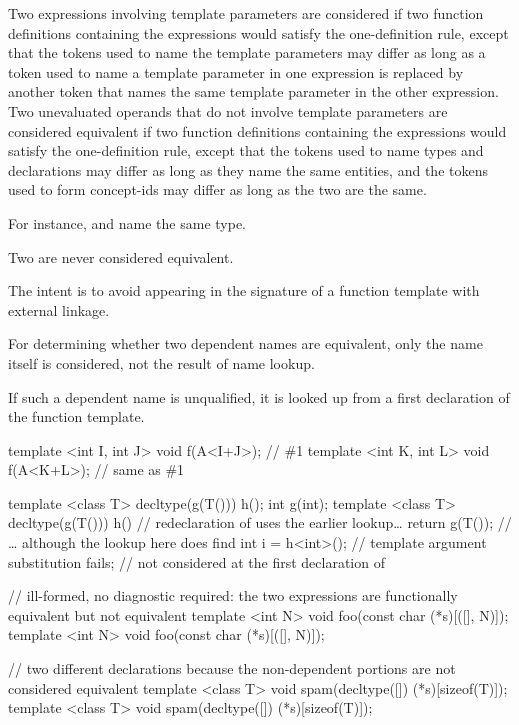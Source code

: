 \pnum
{}%
Two expressions involving template parameters are considered
if two function definitions containing the expressions would satisfy
the one-definition rule, except that the tokens used
to name the template parameters may differ as long as a token used to
name a template parameter in one expression is replaced by another token
that names the same template parameter in the other expression.
Two unevaluated operands that do not involve template parameters
are considered equivalent
if two function definitions containing the expressions
would satisfy the one-definition rule,
except that the tokens used to name types and declarations may differ
as long as they name the same entities, and
the tokens used to form concept-ids may differ
as long as the two  are the same.
\begin{note}
For instance,  and  name the same type.
\end{note}
Two  are never considered equivalent.
\begin{note}
The intent is to avoid  appearing in the
signature of a function template with external linkage.
\end{note}
For determining whether two dependent names are equivalent,
only the name itself is considered, not the result of name lookup.
\begin{note}
If such a dependent name is unqualified,
it is looked up from
a first declaration of the function template.
\end{note}
\begin{example}
\begin{codeblock}
template <int I, int J> void f(A<I+J>);         // \#1
template <int K, int L> void f(A<K+L>);         // same as \#1

template <class T> decltype(g(T())) h();
int g(int);
template <class T> decltype(g(T())) h()         // redeclaration of  uses the earlier lookup\ldots
  { return g(T()); }                            // \ldots{} although the lookup here does find 
int i = h<int>();                               // template argument substitution fails; 
                                                // not considered at the first declaration of 

// ill-formed, no diagnostic required: the two expressions are functionally equivalent but not equivalent
template <int N> void foo(const char (*s)[([]{}, N)]);
template <int N> void foo(const char (*s)[([]{}, N)]);

// two different declarations because the non-dependent portions are not considered equivalent
template <class T> void spam(decltype([]{}) (*s)[sizeof(T)]);
template <class T> void spam(decltype([]{}) (*s)[sizeof(T)]);
\end{codeblock}
\end{example}
